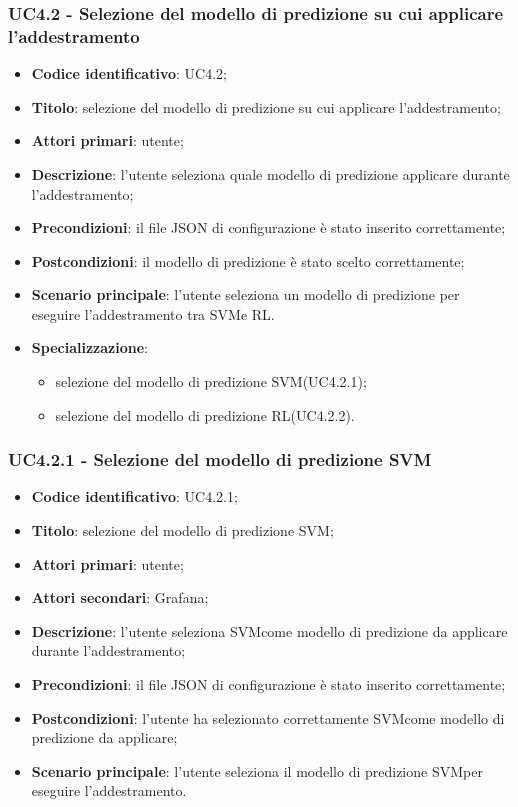 \subsubsection{UC4.2 - Selezione del modello di predizione su cui applicare l'addestramento}
\begin{itemize}
    \item \textbf{Codice identificativo}: UC4.2;
    \item \textbf{Titolo}: selezione del modello di predizione su cui applicare l'addestramento;
    \item \textbf{Attori primari}: utente;
    \item \textbf{Descrizione}: l'utente seleziona quale modello di predizione applicare durante l'addestramento;
    \item \textbf{Precondizioni}: il file JSON di configurazione è stato inserito correttamente;
    \item \textbf{Postcondizioni}: il modello di predizione è stato scelto correttamente;
    \item \textbf{Scenario principale}: l'utente seleziona un modello di predizione per eseguire l'addestramento tra SVM\glosp e RL\glo.
    \item \textbf{Specializzazione}:
    \begin{itemize}
    	\item selezione del modello di predizione SVM\glosp (UC4.2.1);
    	\item selezione del modello di predizione RL\glosp (UC4.2.2).
    \end{itemize}   
\end{itemize}
\subsubsection{UC4.2.1 - Selezione del modello di predizione SVM}
\begin{itemize}
	\item \textbf{Codice identificativo}: UC4.2.1;
	\item \textbf{Titolo}: selezione del modello di predizione SVM\glo;
	\item \textbf{Attori primari}: utente;
	\item \textbf{Attori secondari}: Grafana\glo;
	\item \textbf{Descrizione}: l'utente seleziona SVM\glosp come modello di predizione da applicare durante l'addestramento;
	\item \textbf{Precondizioni}: il file JSON di configurazione è stato inserito correttamente;
	\item \textbf{Postcondizioni}: l'utente ha selezionato correttamente SVM\glosp come modello di predizione da applicare;
	\item \textbf{Scenario principale}: l'utente seleziona il modello di predizione SVM\glosp per eseguire l'addestramento.
\end{itemize}
